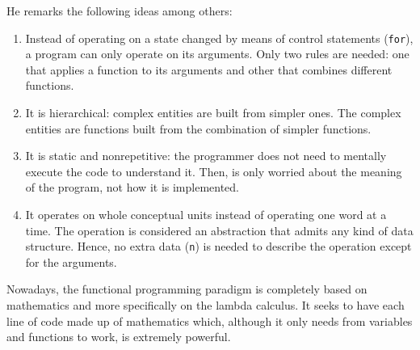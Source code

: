 He remarks the following ideas among others:
\vspace{-0.3cm}
\begin{enumerate}[noitemsep, label=(\roman*)]
    \item Instead of operating on a state changed by means of control statements (\texttt{for}), a program can only operate on its arguments. 
    Only two rules are needed: one that applies a function to its arguments and other that combines different functions. 
    
    \item It is hierarchical: complex entities are built from simpler ones. 
    The complex entities are functions built from the combination of simpler functions.
    
    \item It is static and nonrepetitive: the programmer does not need to mentally execute the code to understand it. 
    Then, is only worried about the meaning of the program, not how it is implemented. 
    
    \item It operates on whole conceptual units instead of operating one word at a time. 
    The operation is considered an abstraction that admits any kind of data structure. 
    Hence, no extra data (\texttt{n}) is needed to describe the operation except for the arguments. 
\end{enumerate}
 
Nowadays, the functional programming paradigm is completely based on mathematics and 
more specifically on the lambda calculus. 
It seeks to have each line of code made up of mathematics which, 
although it only needs from variables and functions to work, is extremely powerful.

